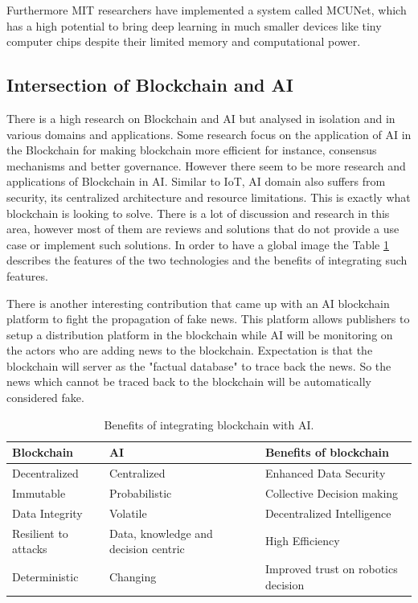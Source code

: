 Furthermore MIT researchers \cite{mit123} have implemented a system called MCUNet, which has a high potential to bring deep learning in much smaller devices like tiny computer chips despite their limited memory and computational power. 

\subsection{Intersection of Blockchain and AI}

There is a high research on Blockchain and AI but analysed in isolation and in various domains and applications. Some research \cite{8481263} focus on the application of AI in the Blockchain for making blockchain more efficient for instance, consensus mechanisms and better governance. However there seem to be more research and applications of Blockchain in AI. Similar to IoT, AI domain also suffers from security, its centralized architecture and resource limitations. This is exactly what blockchain is looking to solve. There is a lot of discussion and research in this area, however most of them are reviews and solutions that do not provide a use case or implement such solutions. In order to have a global image the Table \ref{crouch} describes the features of the two technologies and the benefits of integrating such features.

There is another interesting contribution \cite{8884985} that came up with an AI blockchain platform to fight the propagation of fake news. This platform allows publishers to setup a distribution platform in the blockchain while AI will be monitoring on the actors who are adding news to the blockchain. Expectation is that the blockchain will server as the "factual database" to trace back the news. So the news which cannot be traced back to the blockchain will be automatically considered fake. 




\begin{table}[hbt!]

    
    \begin{tabular}{  p{4.4cm}  p{4.4cm}  p{5.4cm} }
      
\textbf{Blockchain}      
& \textbf{AI}   
& \textbf{Benefits of blockchain} \\\midrule
Decentralized & Centralized        
& Enhanced Data Security \\\hline

Immutable & Probabilistic       
& Collective Decision making \\\hline


Data Integrity & Volatile      
& Decentralized Intelligence \\\hline

Resilient to attacks & Data, knowledge and decision centric     
& High Efficiency \\\hline

Deterministic  &
Changing      
& Improved trust on robotics decision \\
        \bottomrule
    \end{tabular}
    \caption{Benefits of integrating blockchain with AI.}
    \label{crouch}
\end{table}

